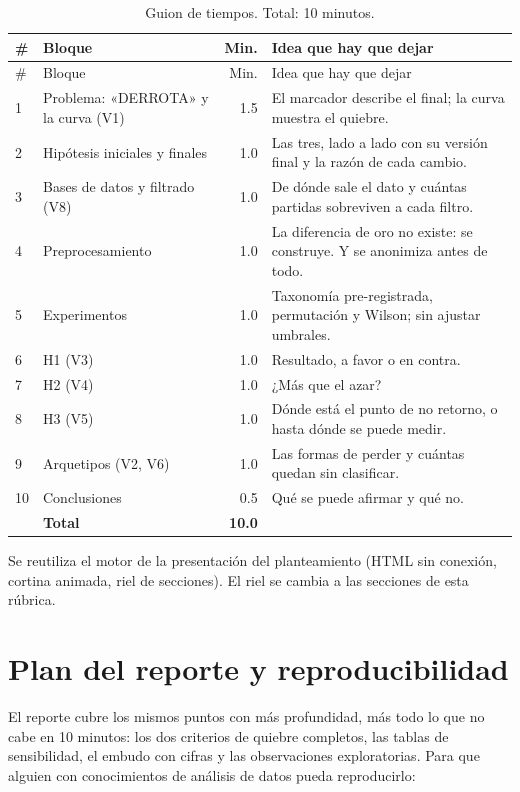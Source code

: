 \documentclass[11pt,letterpaper]{article}
\begin{document}
\begin{longtable}{p{0.6cm}p{5.0cm}r p{7.0cm}}
\caption{Guion de tiempos. Total: 10 minutos.}\\
\toprule
\# & Bloque & Min. & Idea que hay que dejar \\
\midrule
\endfirsthead
\toprule
\# & Bloque & Min. & Idea que hay que dejar \\
\midrule
\endhead
1 & Problema: «DERROTA» y la curva (V1) & 1.5 & El marcador describe el final; la curva muestra el quiebre. \\
2 & Hipótesis iniciales y finales & 1.0 & Las tres, lado a lado con su versión final y la razón de cada cambio. \\
3 & Bases de datos y filtrado (V8) & 1.0 & De dónde sale el dato y cuántas partidas sobreviven a cada filtro. \\
4 & Preprocesamiento & 1.0 & La diferencia de oro no existe: se construye. Y se anonimiza antes de todo. \\
5 & Experimentos & 1.0 & Taxonomía pre-registrada, permutación y Wilson; sin ajustar umbrales. \\
6 & H1 (V3) & 1.0 & Resultado, a favor o en contra. \\
7 & H2 (V4) & 1.0 & ¿Más que el azar? \\
8 & H3 (V5) & 1.0 & Dónde está el punto de no retorno, o hasta dónde se puede medir. \\
9 & Arquetipos (V2, V6) & 1.0 & Las formas de perder y cuántas quedan sin clasificar. \\
10 & Conclusiones & 0.5 & Qué se puede afirmar y qué no. \\
\midrule
 & \textbf{Total} & \textbf{10.0} & \\
\bottomrule
\end{longtable}

\noindent Se reutiliza el motor de la presentación del planteamiento (HTML sin
conexión, cortina animada, riel de secciones). El riel se cambia a las secciones de
esta rúbrica.

\section{Plan del reporte y reproducibilidad}

El reporte cubre los mismos puntos con más profundidad, más todo lo que no cabe en 10
minutos: los dos criterios de quiebre completos, las tablas de sensibilidad, el
embudo con cifras y las observaciones exploratorias. Para que alguien con
conocimientos de análisis de datos pueda reproducirlo:
\end{document}

